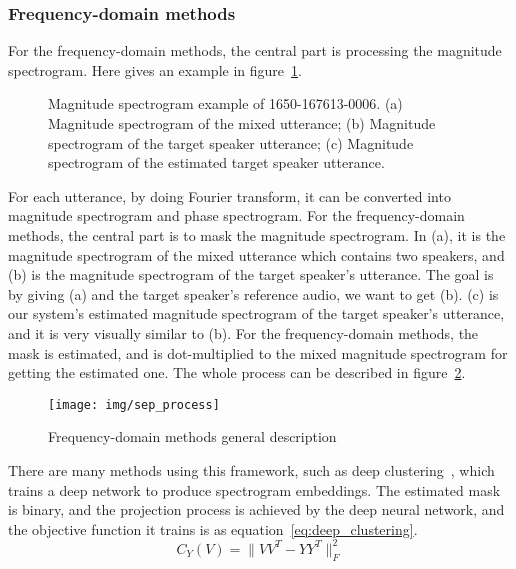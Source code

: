 \subsubsection{Frequency-domain methods}

For the frequency-domain methods, the central part is processing the magnitude spectrogram. Here gives an example in figure~\ref{fig:spec_exp}.
\begin{figure}
    \centering
    \caption{Magnitude spectrogram example of 1650-167613-0006. (a) Magnitude spectrogram of the mixed utterance; (b) Magnitude spectrogram of the target speaker utterance; (c) Magnitude spectrogram of the estimated target speaker utterance. }
    \label{fig:spec_exp}
\end{figure}

For each utterance, by doing Fourier transform, it can be converted into magnitude spectrogram and phase spectrogram.
For the frequency-domain methods, the central part is to mask the magnitude spectrogram.
In (a), it is the magnitude spectrogram of the mixed utterance which contains two speakers, and (b) is the magnitude spectrogram of the target speaker's utterance.
The goal is by giving (a) and the target speaker's reference audio, we want to get (b). (c) is our system's estimated magnitude spectrogram of the target speaker's utterance, and it is very visually similar to (b).
For the frequency-domain methods, the mask is estimated, and is dot-multiplied to the mixed magnitude spectrogram for getting the estimated one.
The whole process can be described in figure~\ref{fig:sep_process}.
\begin{figure}[!htbp]
    \centering
    \texttt{[image: img/sep\_process]}
    \caption{Frequency-domain methods general description}
    \label{fig:sep_process}
\end{figure}

There are many methods using this framework, such as deep clustering~\cite{deep_clustering}, which trains a deep network to produce spectrogram embeddings.
The estimated mask is binary, and the projection process is achieved by the deep neural network, and the objective function it trains is as equation~\ref{eq:deep_clustering}.
\begin{equation}
    C_Y\left( V \right) = \| VV^T - YY^T \|_F^2
    \label{eq:deep_clustering}
\end{equation}

